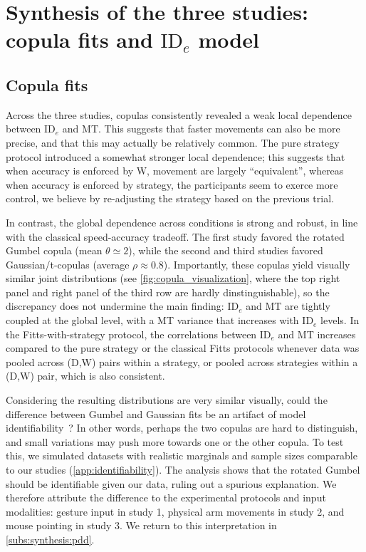 \documentclass[acmlarge, manuscript,review]{acmart}
\newcommand{\ide}{\ensuremath{{\text{ID}_e}}\xspace}
\begin{document}
\section{Synthesis of the three studies: copula fits and \ide model}


\subsection{Copula fits}
Across the three studies, copulas consistently revealed a weak local dependence between \ide and MT. This suggests that faster movements can also be more precise, and that this may actually be relatively common. The pure strategy protocol introduced a somewhat stronger local dependence; this suggests that when accuracy is enforced by W, movement are largely ``equivalent'', whereas when accuracy is enforced by strategy, the participants seem to exerce more control, we believe \eg by re-adjusting the strategy based on the previous trial. 

In contrast, the global dependence across conditions is strong and robust, in line with the classical speed-accuracy tradeoff. The first study favored the rotated Gumbel copula (mean $\theta \simeq 2$), while the second and third studies favored Gaussian/t-copulas (average $\rho \approx 0.8$). Importantly, these copulas yield visually similar joint distributions (see \autoref{fig:copula_visualization}, where the top right panel and right panel of the third row are hardly dinstinguishable), so the discrepancy does not undermine the main finding: \ide and MT are tightly coupled at the global level, with a MT variance that increases with \ide levels. In the Fitts-with-strategy protocol, the correlations between \ide and MT increases compared to the pure strategy or the classical Fitts protocols whenever data was pooled across (D,W) pairs within a strategy, or pooled across strategies within a (D,W) pair, which is also consistent.


Considering the resulting distributions are very similar visually, could the difference between Gumbel and Gaussian fits be an artifact of model identifiability~\cite{gori2024, wilson2019}? In other words, perhaps the two copulas are hard to distinguish, and small variations may push more towards one or the other copula. To test this, we simulated datasets with realistic marginals and sample sizes comparable to our studies (\autoref{app:identifiability}). The analysis shows that the rotated Gumbel should be identifiable given our data, ruling out a spurious explanation. We therefore attribute the difference to the experimental protocols and input modalities: gesture input in study 1, physical arm movements in study 2, and mouse pointing in study 3. We return to this interpretation in \autoref{subs:synthesis:pdd}.
\end{document}
